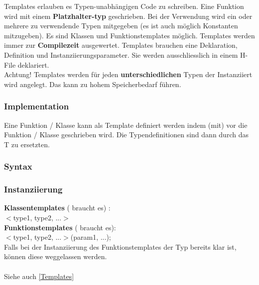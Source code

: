 Templates erlauben es Typen-unabhängigen Code zu schreiben. 
Eine Funktion wird mit einem \textbf{Platzhalter-typ} geschrieben. 
Bei der Verwendung wird ein oder mehrere zu verwendende Typen mitgegeben (es ist auch möglich Konstanten mitzugeben). 
Es sind Klassen und Funktionstemplates möglich. 
Templates werden immer zur \textbf{Compilezeit} ausgewertet. 
Templates brauchen eine Deklaration, Definition und Instanziierungsparameter. 
Sie werden ausschliesslich in einem H-File deklariert.\\
Achtung! Templates werden für jeden \textbf{unterschiedlichen} Typen der Instanziiert wird angelegt. 
Das kann zu hohem Speicherbedarf führen.

\subsubsection{Implementation}

Eine Funktion / Klasse kann als Template definiert werden indem  (mit\say{$<>$}) vor die Funktion / Klasse geschrieben wird. 
Die Typendefinitionen sind dann durch das T zu ersetzten. 



\subsubsection{Syntax}



\subsubsection{Instanziierung}

\textbf{Klassentemplates} (\say{$<>$} braucht es) :\\
$<$type1, type2, ...$>$ \\

\textbf{Funktionstemplates} (\say{$<>$} braucht es):\\
$<$type1, type2, ...$>$(param1, ...);\\

Falls bei der Instanziierung des Funktionstemplates der Typ bereits klar ist, können diese weggelassen werden.\\ 
\\
Siehe auch \ref{Templates}

\nextcol

